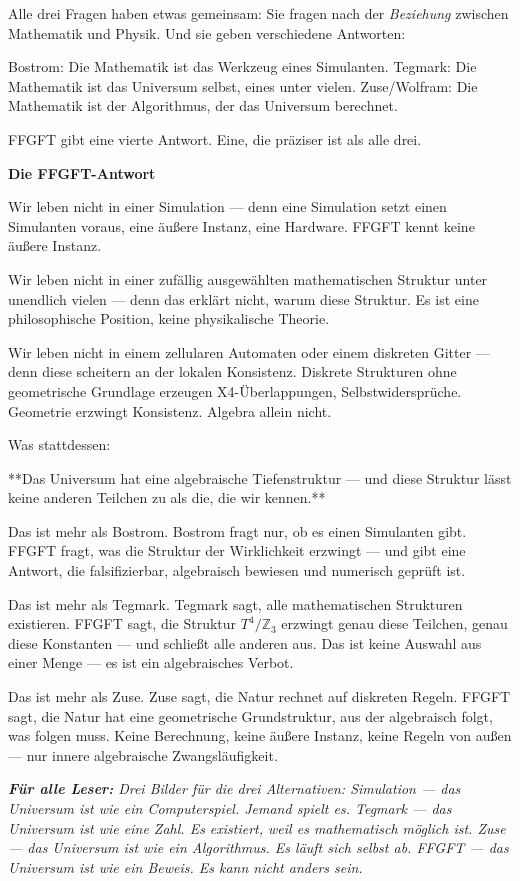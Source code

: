 \documentclass[11pt,oneside]{book}
\newenvironment{laierspur}{%
  \par\vspace{4pt}%
  \noindent\small\itshape\color{blue!60!black}%
  \textbf{Für alle Leser:}\enspace\ignorespaces}{%
  \par\vspace{4pt}\normalsize\normalfont\normalcolor}
\begin{document}
Alle drei Fragen haben etwas gemeinsam: Sie fragen nach der \textit{Beziehung}
zwischen Mathematik und Physik. Und sie geben verschiedene Antworten:


Bostrom: Die Mathematik ist das Werkzeug eines Simulanten.
Tegmark: Die Mathematik ist das Universum selbst, eines unter vielen.
Zuse/Wolfram: Die Mathematik ist der Algorithmus, der das Universum berechnet.


FFGFT gibt eine vierte Antwort. Eine, die präziser ist als alle drei.


\textbf{Die FFGFT-Antwort}


Wir leben nicht in einer Simulation — denn eine Simulation setzt einen
Simulanten voraus, eine äußere Instanz, eine Hardware. FFGFT kennt
keine äußere Instanz.


Wir leben nicht in einer zufällig ausgewählten mathematischen Struktur
unter unendlich vielen — denn das erklärt nicht, warum diese Struktur.
Es ist eine philosophische Position, keine physikalische Theorie.


Wir leben nicht in einem zellularen Automaten oder einem diskreten
Gitter — denn diese scheitern an der lokalen Konsistenz. Diskrete
Strukturen ohne geometrische Grundlage erzeugen X4-Überlappungen,
Selbstwidersprüche. Geometrie erzwingt Konsistenz. Algebra allein nicht.


Was stattdessen:


**Das Universum hat eine algebraische Tiefenstruktur — und diese Struktur
lässt keine anderen Teilchen zu als die, die wir kennen.**


Das ist mehr als Bostrom. Bostrom fragt nur, ob es einen Simulanten gibt.
FFGFT fragt, was die Struktur der Wirklichkeit erzwingt — und gibt eine
Antwort, die falsifizierbar, algebraisch bewiesen und numerisch geprüft ist.


Das ist mehr als Tegmark. Tegmark sagt, alle mathematischen Strukturen
existieren. FFGFT sagt, die Struktur $T^4/\mathbb{Z}_3$ erzwingt genau diese Teilchen,
genau diese Konstanten — und schließt alle anderen aus. Das ist keine
Auswahl aus einer Menge — es ist ein algebraisches Verbot.


Das ist mehr als Zuse. Zuse sagt, die Natur rechnet auf diskreten Regeln.
FFGFT sagt, die Natur hat eine geometrische Grundstruktur, aus der
algebraisch folgt, was folgen muss. Keine Berechnung, keine äußere Instanz,
keine Regeln von außen — nur innere algebraische Zwangsläufigkeit.


\begin{laierspur}
Drei Bilder für die drei Alternativen:
Simulation — das Universum ist wie ein Computerspiel. Jemand spielt es.
Tegmark — das Universum ist wie eine Zahl. Es existiert, weil es
mathematisch möglich ist.
Zuse — das Universum ist wie ein Algorithmus. Es läuft sich selbst ab.
FFGFT — das Universum ist wie ein Beweis. Es kann nicht anders sein.
\end{laierspur}
\end{document}
